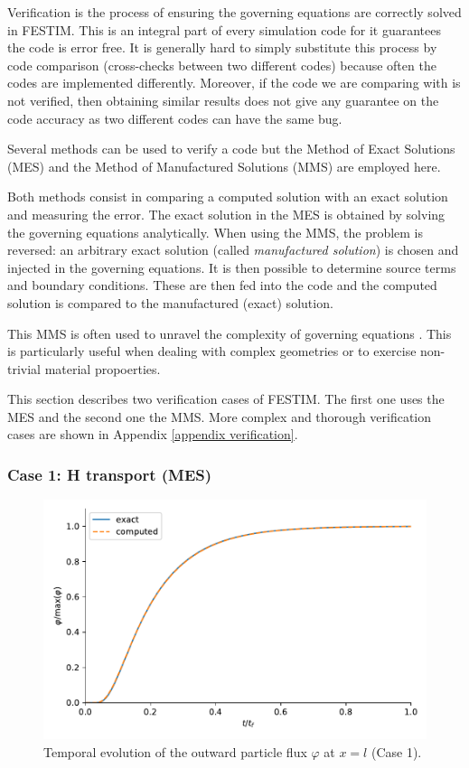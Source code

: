 Verification is the process of ensuring the governing equations are correctly solved in FESTIM.
This is an integral part of every simulation code for it guarantees the code is error free.
It is generally hard to simply substitute this process by code comparison (cross-checks between two different codes) because often the codes are implemented differently.
Moreover, if the code we are comparing with is not verified, then obtaining similar results does not give any guarantee on the code accuracy as two different codes can have the same bug.

Several methods can be used to verify a code but the Method of Exact Solutions (MES) and the Method of Manufactured Solutions (MMS) are employed here.

Both methods consist in comparing a computed solution with an exact solution and measuring the error.
The exact solution in the MES is obtained by solving the governing equations analytically.
When using the MMS, the problem is reversed: an arbitrary exact solution (called \textit{manufactured solution}) is chosen and injected in the governing equations.
It is then possible to determine source terms and boundary conditions.
These are then fed into the code and the computed solution is compared to the manufactured (exact) solution.

This MMS is often used to unravel the complexity of governing equations .
This is particularly useful when dealing with complex geometries or to exercise non-trivial material propoerties.

This section describes two verification cases of FESTIM.
The first one uses the MES and the second one the MMS.
More complex and thorough verification cases are shown in Appendix \ref{appendix verification}.

\subsubsection{Case 1: H transport (MES)} \label{analytical}

\begin{figure}
    \centering
    \includegraphics[width=\linewidth]{Figures/Chapter3/mes_festim_effective_diffusion.pdf}
    \caption{Temporal evolution of the outward particle flux $\varphi$ at $x=l$ (Case 1).}
    \label{fig:FESTIM vs analytical}
\end{figure}

